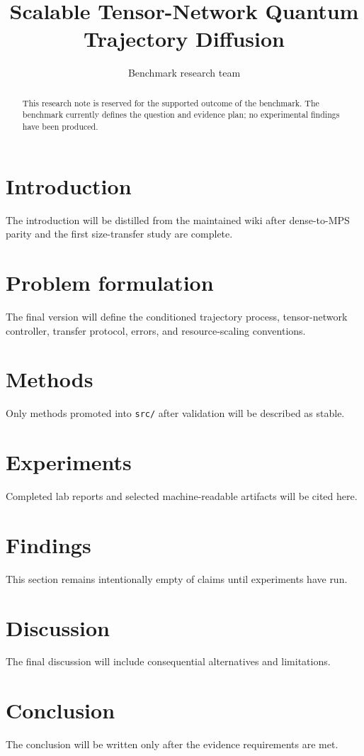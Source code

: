 \documentclass[11pt]{article}
\title{Scalable Tensor-Network Quantum Trajectory Diffusion}
\author{Benchmark research team}
\date{}
\begin{document}
\maketitle


\begin{abstract}
This research note is reserved for the supported outcome of the benchmark. The benchmark currently defines the question and evidence plan; no experimental findings have been produced.
\end{abstract}

\section{Introduction}
The introduction will be distilled from the maintained wiki after dense-to-MPS parity and the first size-transfer study are complete.

\section{Problem formulation}
The final version will define the conditioned trajectory process, tensor-network controller, transfer protocol, errors, and resource-scaling conventions.

\section{Methods}
Only methods promoted into \texttt{src/} after validation will be described as stable.

\section{Experiments}
Completed lab reports and selected machine-readable artifacts will be cited here.

\section{Findings}
This section remains intentionally empty of claims until experiments have run.

\section{Discussion}
The final discussion will include consequential alternatives and limitations.

\section{Conclusion}
The conclusion will be written only after the evidence requirements are met.



\end{document}
